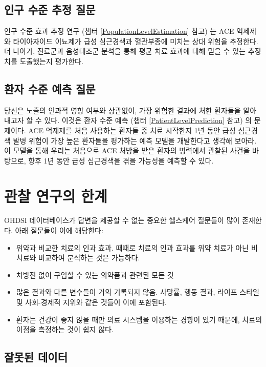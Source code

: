 \documentclass[11pt]{book}
\providecommand{\tightlist}{%
  \setlength{\itemsep}{0pt}\setlength{\parskip}{0pt}}
\theoremstyle{definition}
\theoremstyle{definition}
\theoremstyle{definition}
\theoremstyle{remark}
\begin{document}
\subsection{인구 수준 추정 질문}\label{---}

인구 수준 효과 추정 연구 (챕터 \ref{PopulationLevelEstimation} 참고) 는
ACE 억제제와 타이아자이드 이뇨제가 급성 심근경색과 혈관부종에 미치는
상대 위험을 추정한다. 더 나아가, 진료군과 음성대조군 분석을 통해 평균
치료 효과에 대해 믿을 수 있는 추정치를 도출했는지 평가한다.

\subsection{환자 수준 예측 질문}\label{---}

당신은 노출의 인과적 영향 여부와 상관없이, 가장 위험한 결과에 처한
환자들을 알아내고자 할 수 있다. 이것은 환자 수준 예측 (챕터
\ref{PatientLevelPrediction} 참고) 의 문제이다. ACE 억제제를 처음
사용하는 환자들 중 치료 시작한지 1년 동안 급성 심근경색 발병 위험이 가장
높은 환자들을 평가하는 예측 모델을 개발한다고 생각해 보아라. 이 모델을
통해 우리는 처음으로 ACE 처방을 받은 환자의 병력에서 관찰된 사건을
바탕으로, 향후 1년 동안 급성 심근경색을 겪을 가능성을 예측할 수 있다.

\section{관찰 연구의 한계}\label{--}


OHDSI 데이터베이스가 답변을 제공할 수 없는 중요한 헬스케어 질문들이 많이
존재한다. 아래 질문들이 이에 해당한다:

\begin{itemize}
\tightlist
\item
  위약과 비교한 치료의 인과 효과. 때때로 치료의 인과 효과를 위약 치료가
  아닌 비치료와 비교하여 분석하는 것은 가능하다.
\item
  처방전 없이 구입할 수 있는 의약품과 관련된 모든 것
\item
  많은 결과와 다른 변수들이 거의 기록되지 않음. 사망률, 행동 결과,
  라이프 스타일 및 사회-경제적 지위와 같은 것들이 이에 포함된다.
\item
  환자는 건강이 좋지 않을 때만 의료 시스템을 이용하는 경향이 있기
  때문에, 치료의 이점을 측정하는 것이 쉽지 않다.
\end{itemize}

\subsection{잘못된 데이터}\label{-}
\end{document}
